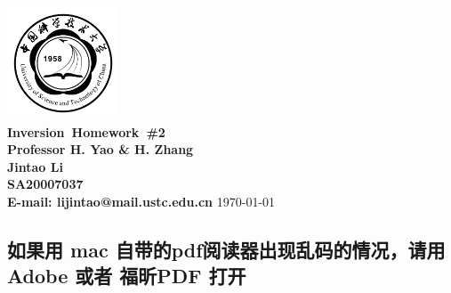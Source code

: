 \documentclass{article}
\makeatletter
\newcommand{\hmwkTitle}{Homework\ \#2}
\newcommand{\hmwkClass}{Inversion}
\newcommand{\hmwkClassInstructor}{Professor H. Yao \& H. Zhang}
\newcommand{\hmwkAuthorName}{\textbf{Jintao Li}}
\newcommand{\hmwkAuthorID}{\textbf{SA20007037}}
\newcommand{\hmwkAuthoremail}{\textbf{E-mail: lijintao@mail.ustc.edu.cn}}
\makeatother
\begin{document}
\begin{titlepage}

\begin{center}

\textcolor{ustcblue}{\includegraphics[width=0.25\textwidth]{./ustc_logo_fig.pdf} \\ [1cm]}
{ \Huge \bfseries \hmwkClass\ \hmwkTitle}\\[1cm]

\large \textbf{\hmwkClassInstructor} \\ [5cm]

\large \hmwkAuthorName \\ [0.25cm]
\large \hmwkAuthorID \\ [0.25cm]
\large \hmwkAuthoremail
\vfill
{\large \today}

\end{center}

\end{titlepage}

\begin{center}
    \section{如果用 mac 自带的pdf阅读器出现乱码的情况，请用 Adobe 或者 福昕PDF 打开}
\end{center}
\end{document}
